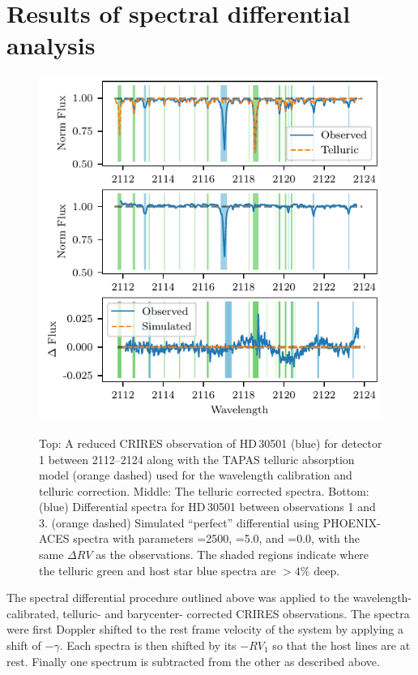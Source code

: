 \section{Results of spectral differential analysis}
\label{subsec:differential_results}

\begin{figure}
    \centering
    \includegraphics[width=0.8\hsize]{figures/direct-recovery/differential.pdf}\\
    \caption[Example of the spectral differential technique.]{Top: A reduced {CRIRES} observation of {HD\,30501} (blue) for detector 1 between 2112--2124\nm{} along with the {TAPAS} telluric absorption model ({orange} dashed) used for the wavelength calibration and telluric correction.
    Middle: The telluric corrected spectra.
    Bottom: ({blue}) Differential spectra for {HD\,30501} between observations 1 and 3.
    ({orange} dashed) Simulated ``perfect'' differential using {PHOENIX-ACES} spectra with parameters \Teff{}=2500\K{}, \logg{}=5.0, and \feh{}=0.0, with the same \(\Delta {RV}\) as the observations.
    The shaded regions indicate where the telluric {green} and host star {blue} spectra are \(> 4\%\) deep.}
    \label{fig:spectral_example}
\end{figure}


The spectral differential procedure outlined above was applied to the wavelength-calibrated, telluric- and barycenter- corrected {CRIRES} observations.
The spectra were first Doppler shifted to the rest frame velocity of the system by applying a shift of \(-\gamma\).
Each spectra is then shifted by its $-{RV}_{1}$ so that the host lines are at rest.
Finally one spectrum is subtracted from the other as described above.

